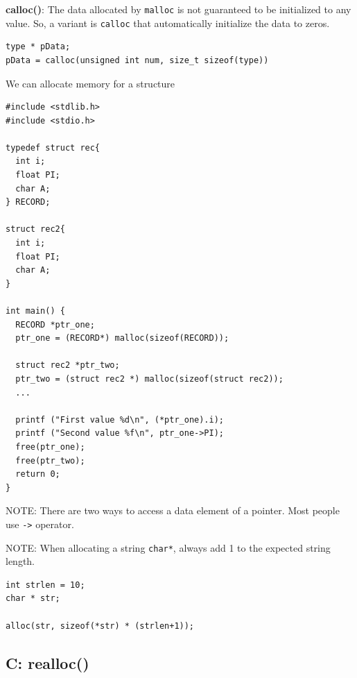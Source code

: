 {\bf calloc()}: The data allocated by \verb!malloc! is not guaranteed to be
initialized to any value. So, a variant is \verb!calloc! that automatically
initialize the data to zeros.

\begin{lstlisting}
type * pData;
pData = calloc(unsigned int num, size_t sizeof(type))
\end{lstlisting}

We can allocate memory for a structure
\begin{verbatim}
#include <stdlib.h>
#include <stdio.h>

typedef struct rec{
  int i;
  float PI;
  char A;
} RECORD;

struct rec2{
  int i;
  float PI;
  char A;
}

int main() {
  RECORD *ptr_one;
  ptr_one = (RECORD*) malloc(sizeof(RECORD));

  struct rec2 *ptr_two;
  ptr_two = (struct rec2 *) malloc(sizeof(struct rec2)); 
  ...

  printf ("First value %d\n", (*ptr_one).i);
  printf ("Second value %f\n", ptr_one->PI);  
  free(ptr_one);
  free(ptr_two);
  return 0; 
}
\end{verbatim}
NOTE: There are two ways to access a data element of a pointer. Most people use
\verb!->! operator.

NOTE: When allocating a string \verb!char*!, always add 1 to the expected string
length.
\begin{verbatim}
int strlen = 10;
char * str;

alloc(str, sizeof(*str) * (strlen+1));
\end{verbatim}

\subsection{C: realloc()}
\label{sec:realloc()}

